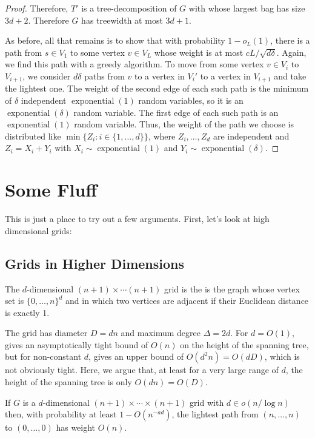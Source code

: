 \documentclass[lotsofwhite]{patmorin}
\DeclareMathOperator{\exponential}{exponential}
\begin{document}
\begin{proof}
  Therefore, $T'$ is a tree-decomposition of $G$ with whose largest bag
  has size $3d+2$.  Therefore $G$ has treewidth at most $3d+1$.

  As before, all that remains is to show that with probability
  $1-o_L(1)$, there is a path from $s\in V_1$ to some vertex $v\in
  V_{L}$ whose weight is at most $cL/\sqrt{d\delta}$.  Again, we
  find this path with a greedy algorithm.  To move from some vertex
  $v\in V_i$ to $V_{i+1}$, we consider $d\delta$ paths from $v$ to a
  vertex in $V_i'$ to a vertex in $V_{i+1}$ and take the lightest one.
  The weight of the second edge of each such path is the minimum of
  $\delta$ independent $\exponential(1)$ random variables, so it is an
  $\exponential(\delta)$ random variable.  The first edge of each such
  path is an $\exponential(1)$ random variable.  Thus, the weight of the
  path we choose is distributed like $\min\{Z_i:i\in\{1,\ldots,d\}\}$,
  where $Z_i,\ldots,Z_d$ are independent and $Z_i=X_i+Y_i$ with $X_i\sim
  \exponential(1)$ and $Y_i\sim\exponential(\delta)$.
\end{proof}

 

\section{Some Fluff}

This is just a place to try out a few arguments.  First, let's look at high dimensional grids:

\subsection{Grids in Higher Dimensions}
\label{sec:grids_old}

The $d$-dimensional $(n+1)\times\cdots (n+1)$ grid is the is the graph
whose vertex set is $\{0,\ldots,n\}^d$ and in which two vertices are
adjacent if their Euclidean distance is exactly 1.

The grid has diameter $D=dn$ and maximum degree $\Delta=2d$.  For
$d=O(1)$,  gives an asymptotically tight bound of
$O(n)$ on the height of the spanning tree, but for non-constant $d$,
gives an upper bound of $O(d^2n) = O(dD)$, which is not obviously tight.
Here, we argue that, at least for a very large range of $d$, the height
of the spanning tree is only $O(dn)=O(D)$.

\begin{lem}
  If $G$ is a $d$-dimensional $(n+1)\times\cdots\times(n+1)$  grid with
  $d\in o(n/\log n)$ then, with probability at least $1-O(n^{-ad})$, the
  lightest path from $(n,\ldots,n)$ to $(0,\ldots,0)$ has weight $O(n)$.
\end{lem}
\end{document}
